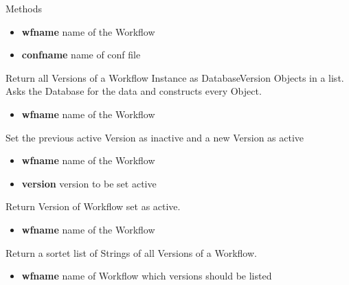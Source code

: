 \begin{methodenv}{Methods}
\begin{itemize}
	\item \textbf{wf\textunderscore name}
	name of the Workflow
	\item \textbf{conf\textunderscore name}
	name of conf file
\end{itemize}

 Return all Versions of a Workflow Instance as DatabaseVersion Objects in a list.
 Asks the Database for the data and constructs every Object.
 
\begin{itemize}
	\item \textbf{wf\textunderscore name}
	name of the Workflow
\end{itemize}

Set the previous active Version as inactive and a new Version as active

\begin{itemize}
	\item \textbf{wf\textunderscore name}
	name of the Workflow
	\item \textbf{version}
	version to be set active
\end{itemize}

Return Version of Workflow set as active.

\begin{itemize}
	\item \textbf{wf\textunderscore name}
	name of the Workflow
\end{itemize}

Return a sortet list of Strings of all Versions of a Workflow.

\begin{itemize}
	\item \textbf{wf\textunderscore name}
	name of Workflow which versions should be listed
\end{itemize}

\end{methodenv}

